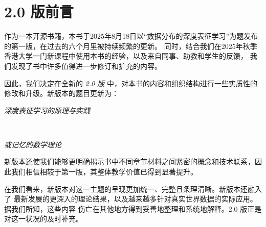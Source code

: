 \documentclass[../../book-main.tex]{subfiles}
\begin{document}
\chapter*{2.0 版前言}



作为一本开源书籍，本书于2025年8月18日以“数据分布的深度表征学习”为题发布的第一版，在过去的六个月里被持续频繁的更新。
同时，结合我们在2025年秋季香港大学一门新课程中使用本书的经验，以及来自同事、助教和学生的反馈，
我们发现了书中许多值得进一步修订和扩充的内容。

因此，我们决定在全新的 \textit{2.0 版} 中，对本书的内容和组织结构进行一些实质性的修改和升级。新版本的题目更新为：\\
\centerline{\em 深度表征学习的原理与实践}\\ 
\centerline{\em \small 或记忆的数学理论}
新版本还使我们能够更明确揭示书中不同章节材料之间紧密的概念和技术联系，因此我们相信相较于第一版，其整体教学价值已得到显著提升。

在我们看来，新版本对这一主题的呈现更加统一、完整且条理清晰。新版本还融入了
最新发展的更深入的理论结果，以及越来越多针对真实世界数据的实际应用。据我们所知，这些内容
伤亡在其他地方得到妥善地整理和系统地解释。2.0 版正是对这一状况的及时补充。
\end{document}
